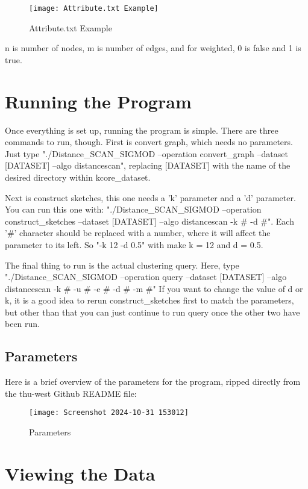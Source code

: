 \documentclass{article}
\begin{document}
\begin{figure}[H]
	\centering
	\texttt{[image: Attribute.txt Example]}
	\caption{Attribute.txt Example}
	\label{fig:my_label}
\end{figure}

\noindent n is number of nodes, m is number of edges, and for weighted, 0 is false and 1 is true.

\section{Running the Program}

Once everything is set up, running the program is simple.  There are three commands to run, though.  First is convert graph, which needs no parameters.  Just type "./Distance\_SCAN\_SIGMOD --operation convert\_graph --dataset [DATASET] --algo distancescan", replacing [DATASET] with the name of the desired directory within kcore\_dataset.

Next is construct sketches, this one needs a 'k' parameter and a 'd' parameter.  You can run this one with: "./Distance\_SCAN\_SIGMOD --operation construct\_sketches --dataset [DATASET] --algo distancescan -k \# -d \#".  Each '\#' character should be replaced with a number, where it will affect the parameter to its left.  So "-k 12 -d 0.5" with make k = 12 and d = 0.5.

The final thing to run is the actual clustering query.  Here, type "./Distance\_SCAN\_SIGMOD --operation query --dataset [DATASET] --algo distancescan -k \# -u \# -e \#  -d \# -m \#"  If you want to change the value of d or k, it is a good idea to rerun construct\_sketches first to match the parameters, but other than that you can just continue to run query once the other two have been run.

\subsection{Parameters}
Here is a brief overview of the parameters for the program, ripped directly from the thu-west Github README file:

\begin{figure}[H]
	\centering
	\texttt{[image: Screenshot 2024-10-31 153012]}
	\caption{Parameters}
	\label{fig:my_label}
\end{figure}


\section{Viewing the Data}
\end{document}
